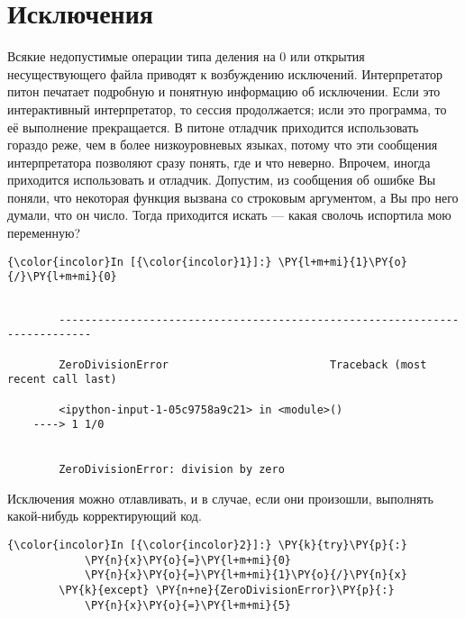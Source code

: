\section{Исключения}
\label{S109}

Всякие недопустимые операции типа деления на 0 или открытия
несуществующего файла приводят к возбуждению исключений. Интерпретатор
питон печатает подробную и понятную информацию об исключении. Если это
интерактивный интерпретатор, то сессия продолжается; исли это программа,
то её выполнение прекращается. В питоне отладчик приходится использовать
гораздо реже, чем в более низкоуровневых языках, потому что эти
сообщения интерпретатора позволяют сразу понять, где и что неверно.
Впрочем, иногда приходится использовать и отладчик. Допустим, из
сообщения об ошибке Вы поняли, что некоторая функция вызвана со
строковым аргументом, а Вы про него думали, что он число. Тогда
приходится искать --- какая сволочь испортила мою переменную?

    \begin{Verbatim}[commandchars=\\\{\}]
{\color{incolor}In [{\color{incolor}1}]:} \PY{l+m+mi}{1}\PY{o}{/}\PY{l+m+mi}{0}
\end{Verbatim}

    \begin{Verbatim}[commandchars=\\\{\}]

        ---------------------------------------------------------------------------

        ZeroDivisionError                         Traceback (most recent call last)

        <ipython-input-1-05c9758a9c21> in <module>()
    ----> 1 1/0
    

        ZeroDivisionError: division by zero

    \end{Verbatim}

    Исключения можно отлавливать, и в случае, если они произошли, выполнять
какой-нибудь корректирующий код.

    \begin{Verbatim}[commandchars=\\\{\}]
{\color{incolor}In [{\color{incolor}2}]:} \PY{k}{try}\PY{p}{:}
            \PY{n}{x}\PY{o}{=}\PY{l+m+mi}{0}
            \PY{n}{x}\PY{o}{=}\PY{l+m+mi}{1}\PY{o}{/}\PY{n}{x}
        \PY{k}{except} \PY{n+ne}{ZeroDivisionError}\PY{p}{:}
            \PY{n}{x}\PY{o}{=}\PY{l+m+mi}{5}
\end{Verbatim}

